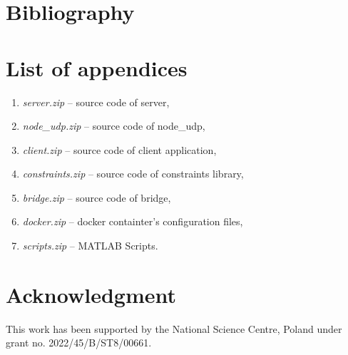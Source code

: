 \chapter{Bibliography}


\printbibliography[type=article,heading=subbibliography,title={Literature}]
\printbibliography[type=online,heading=subbibliography,title={Online}]




\chapter*{List of appendices}

\begin{enumerate}
	\item \textit{server.zip} -- source code of server,
	\item \textit{node\_udp.zip} -- source code of node\_udp,
	\item \textit{client.zip} -- source code of client application,
	\item \textit{constraints.zip} -- source code of constraints library,
	\item \textit{bridge.zip} -- source code of bridge,
	\item \textit{docker.zip} -- docker containter's configuration files,
	\item \textit{scripts.zip} -- MATLAB Scripts.
\end{enumerate}
\thispagestyle{empty}

\chapter*{Acknowledgment}

This work has been supported by the National Science Centre, Poland under grant no. 2022/45/B/ST8/00661.